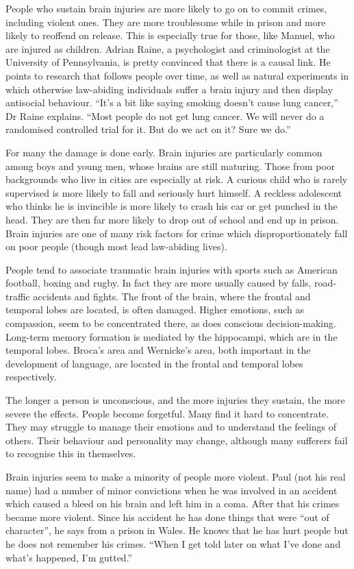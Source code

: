 \documentclass{article}
\begin{document}
People who sustain brain injuries are more likely to go on to commit crimes, including violent ones. They are more troublesome while in prison and more likely to reoffend on release. This is especially true for those, like Manuel, who are injured as children. Adrian Raine, a psychologist and criminologist at the University of Pennsylvania, is pretty convinced that there is a causal link. He points to research that follows people over time, as well as natural experiments in which otherwise law-abiding individuals suffer a brain injury and then display antisocial behaviour. ``It's a bit like saying smoking doesn't cause lung cancer,'' Dr Raine explains. ``Most people do not get lung cancer. We will never do a randomised controlled trial for it. But do we act on it? Sure we do.'' 

For many the damage is done early. Brain injuries are particularly common among boys and young men, whose brains are still maturing. Those from poor backgrounds who live in cities are especially at risk. A curious child who is rarely supervised is more likely to fall and seriously hurt himself. A reckless adolescent who thinks he is invincible is more likely to crash his car or get punched in the head. They are then far more likely to drop out of school and end up in prison. Brain injuries are one of many risk factors for crime which disproportionately fall on poor people (though most lead law-abiding lives). 

People tend to associate traumatic brain injuries with sports such as American football, boxing and rugby. In fact they are more usually caused by falls, road-traffic accidents and fights. The front of the brain, where the frontal and temporal lobes are located, is often damaged. Higher emotions, such as compassion, seem to be concentrated there, as does conscious decision-making. Long-term memory formation is mediated by the hippocampi, which are in the temporal lobes. Broca's area and Wernicke's area, both important in the development of language, are located in the frontal and temporal lobes respectively. 

The longer a person is unconscious, and the more injuries they sustain, the more severe the effects. People become forgetful. Many find it hard to concentrate. They may struggle to manage their emotions and to understand the feelings of others. Their behaviour and personality may change, although many sufferers fail to recognise this in themselves. 

Brain injuries seem to make a minority of people more violent. Paul (not his real name) had a number of minor convictions when he was involved in an accident which caused a bleed on his brain and left him in a coma. After that his crimes became more violent. Since his accident he has done things that were ``out of character'', he says from a prison in Wales. He knows that he has hurt people but he does not remember his crimes. ``When I get told later on what I've done and what's happened, I'm gutted.'' 
\end{document}
